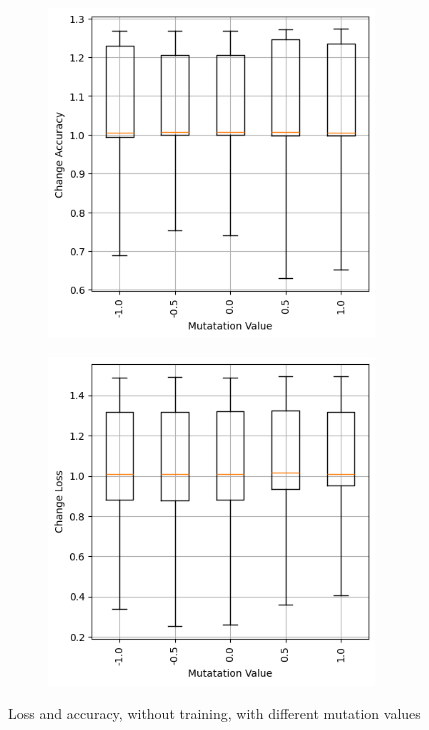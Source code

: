 \begin{figure}
    \begin{subfigure}{0.5\textwidth}
        \centering
        \includegraphics[width=0.95\textwidth]{plots/MutatationValue_NotTrained_accuracy.png}
    \end{subfigure}
    \begin{subfigure}{0.5\textwidth}
        \centering
        \includegraphics[width=0.95\textwidth]{plots/MutatationValue_NotTrained_loss.png}
    \end{subfigure}
    \caption{Loss and accuracy, without training, with different mutation values}
    \label{fig:mutation-values-notraining}
\end{figure}
